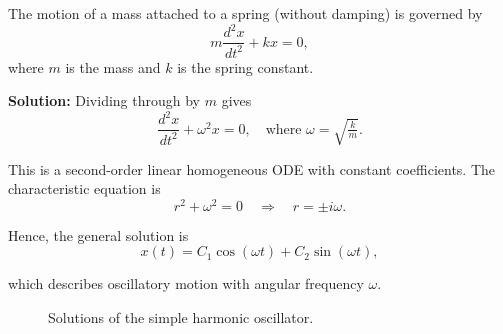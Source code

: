 \begin{example}
The motion of a mass attached to a spring (without damping) is governed by
\[
m \frac{d^2x}{dt^2} + kx = 0,
\]
where $m$ is the mass and $k$ is the spring constant.

\textbf{Solution:}  
Dividing through by $m$ gives
\[
\frac{d^2x}{dt^2} + \omega^2 x = 0, \quad \text{where } \omega = \sqrt{\tfrac{k}{m}}.
\]

This is a second-order linear homogeneous ODE with constant coefficients.  
The characteristic equation is
\[
r^2 + \omega^2 = 0 \quad \Rightarrow \quad r = \pm i\omega.
\]

Hence, the general solution is
\[
x(t) = C_1 \cos(\omega t) + C_2 \sin(\omega t),
\]

which describes oscillatory motion with angular frequency $\omega$.
\end{example}
\begin{figure}[h!]
\centering
{}
\caption{Solutions of the simple harmonic oscillator.}
\end{figure}


